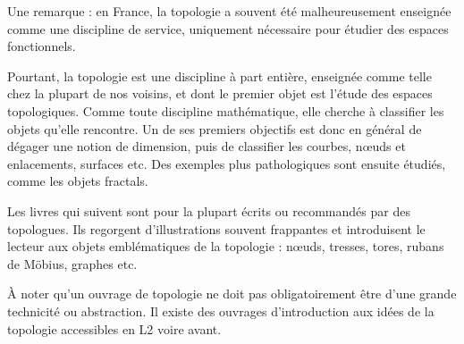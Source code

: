 \documentclass{article}
\begin{document}
Une remarque : en France, la topologie a souvent été malheureusement enseignée comme une discipline de service, uniquement nécessaire pour étudier des espaces fonctionnels.

Pourtant, la topologie est une discipline à part entière, enseignée comme telle chez la plupart de nos voisins, et dont le premier objet est l'étude des espaces topologiques. 
Comme toute discipline mathématique, elle cherche à classifier les objets qu'elle rencontre. Un de ses premiers objectifs est donc en général de dégager une notion de dimension, puis de classifier les courbes, n\oe uds et enlacements, surfaces etc. Des exemples plus pathologiques sont ensuite étudiés, comme les objets fractals.

Les livres qui suivent sont pour la plupart écrits ou recommandés par des topologues. Ils regorgent d'illustrations souvent frappantes et introduisent le lecteur aux objets emblématiques de la topologie : n\oe uds, tresses, tores, rubans de Möbius, graphes etc.

À noter qu'un ouvrage de topologie ne doit pas obligatoirement être d'une grande technicité ou abstraction. Il existe des ouvrages d'introduction aux idées de la topologie accessibles en L2 voire avant.
\end{document}
